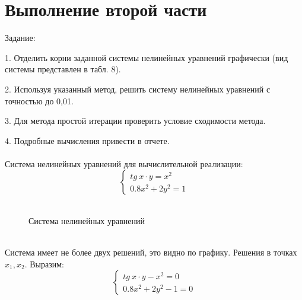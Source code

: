 \documentclass{article}
\begin{document}
\section{Выполнение второй части}
Задание:

1. Отделить корни заданной системы нелинейных уравнений графически (вид
системы представлен в табл. 8).

2. Используя указанный метод, решить систему нелинейных уравнений с точностью до 0,01.

3. Для метода простой итерации проверить условие сходимости метода.

4. Подробные вычисления привести в отчете.
\\
\\
Система нелинейных уравнений для вычислительной реализации:
\[
    \begin{cases}
        tg\ x\cdot y = x^2\\
        0.8x^2+2y^2 = 1
    \end{cases} 
\]
\\
    \begin{figure}
        \centering
        \caption{Система нелинейных уравнений}
    \end{figure}
\\ 
Система имеет не более двух решений, это видно по графику. Решения в точках $x_1, x_2$.
Выразим:
\[\begin{cases}
    tg\ x\cdot y - x^2 = 0\\
    0.8x^2+2y^2 - 1 = 0
\end{cases} 
\]
\end{document}
